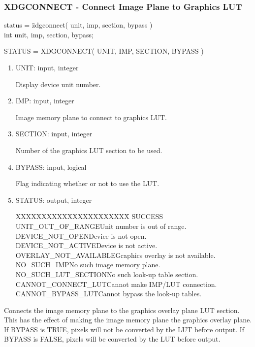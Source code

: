 \subsubsection{XDGCONNECT - Connect Image Plane to Graphics LUT}
\begin{tabbing}
status = \=zdgconnect( unit, imp, section, bypass )\\
\>int  unit, imp, section, bypass;\\
\end{tabbing}
STATUS = XDGCONNECT( UNIT, IMP, SECTION, BYPASS )
\begin{enumerate}
\item UNIT:  input, integer

Display device unit number.
\item IMP:  input, integer

Image memory plane to connect to graphics LUT.
\item SECTION:  input, integer

Number of the graphics LUT section to be used.
\item BYPASS:  input, logical

Flag indicating whether or not to use the LUT.
\item STATUS:  output, integer
\begin{tabbing}
XXXXXXXXXXXXXXXXXXXXXX\=\kill
SUCCESS\\
UNIT\_OUT\_OF\_RANGE\>Unit number is out of range.\\
DEVICE\_NOT\_OPEN\>Device is not open.\\
DEVICE\_NOT\_ACTIVE\>Device is not active.\\
OVERLAY\_NOT\_AVAILABLE\>Graphics overlay is not available.\\
NO\_SUCH\_IMP\>No such image memory plane.\\
NO\_SUCH\_LUT\_SECTION\>No such look-up table section.\\
CANNOT\_CONNECT\_LUT\>Cannot make IMP/LUT connection.\\
CANNOT\_BYPASS\_LUT\>Cannot bypass the look-up tables.\\
\end{tabbing}
\end{enumerate}
Connects the image memory plane to the graphics overlay plane LUT
section.  This has the effect of making the image memory plane the
graphics overlay plane.  If BYPASS is TRUE, pixels will not be
converted by the LUT before output.  If BYPASS is FALSE, pixels will
be converted by the LUT before output.
\newpage
